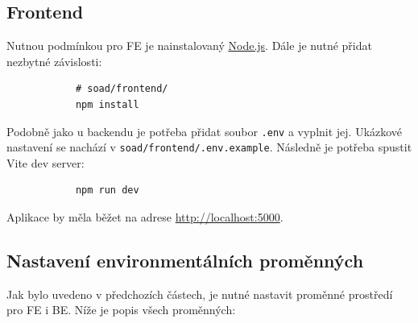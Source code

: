 \documentclass[12pt]{article}
\begin{document}
\begin{teamwork}
        \subsection{Frontend}\label{subsec:frontend}

        Nutnou podmínkou pro FE je nainstalovaný \href{https://nodejs.org/en/download}{Node.js}.
        Dále je nutné přidat nezbytné závislosti:

        \begin{verbatim}
            # soad/frontend/
            npm install
        \end{verbatim}

        Podobně jako u backendu je potřeba přidat soubor \texttt{.env} a vyplnit jej.
        Ukázkové nastavení se nachází v
        \texttt{soad/frontend/.env.example}.
        Následně je potřeba spustit Vite dev server:

        \begin{verbatim}
            npm run dev
        \end{verbatim}

        Aplikace by měla běžet na adrese \href{http://localhost:5000}{http://localhost:5000}.

        \subsection{Nastavení environmentálních proměnných}\label{subsec:nastaveni-environmentalnich-promennych}

        Jak bylo uvedeno v předchozích částech, je nutné nastavit proměnné prostředí pro FE i BE\@.
        Níže je popis všech proměnných:


\end{teamwork}
\end{document}
